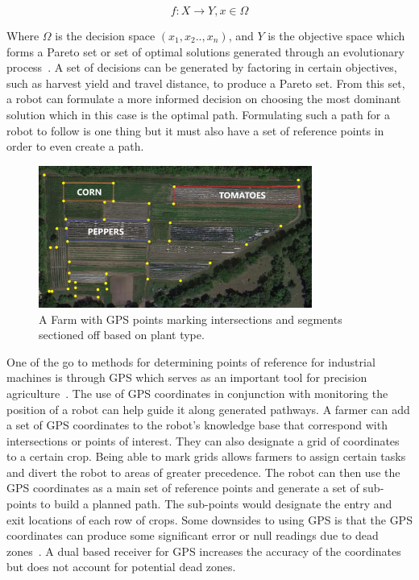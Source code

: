 \documentclass[12pt]{article}
\begin{document}
\begin{equation}
    f: X \rightarrow Y, x \in \Omega
\end{equation}

\noindent Where $\Omega$ is the decision space $(x_1, x_2..,x_n)$, and $Y$ is the objective space which forms a Pareto set or set of optimal solutions generated through an evolutionary process~\cite{zhou2021problem,zitzler2004tutorial}. A set of decisions can be generated by factoring in certain objectives, such as harvest yield and travel distance, to produce a Pareto set. From this set, a robot can formulate a more informed decision on choosing the most dominant solution which in this case is the optimal path. Formulating such a path for a robot to follow is one thing but it must also have a set of reference points in order to even create a path.

\begin{figure}[h]
\centering
\includegraphics[width=0.80\textwidth]{farmgps.png}
\caption{A Farm with GPS points marking intersections and segments sectioned off based on plant type.}
\end{figure}

One of the go to methods for determining points of reference for industrial machines is through GPS which serves as an important tool for precision agriculture~\cite{pandey2021evaluation}. The use of GPS coordinates in conjunction with monitoring the position of a robot can help guide it along generated pathways. A farmer can add a set of GPS coordinates to the robot's knowledge base that correspond with intersections or points of interest. They can also designate a grid of coordinates to a certain crop. Being able to mark grids allows farmers to assign certain tasks and divert the robot to areas of greater precedence. The robot can then use the GPS coordinates as a main set of reference points and generate a set of sub-points to build a planned path. The sub-points would designate the entry and exit locations of each row of crops. Some downsides to using GPS is that the GPS coordinates can produce some significant error or null readings due to dead zones~\cite{pandey2021evaluation}. A dual based receiver for GPS increases the accuracy of the coordinates but does not account for potential dead zones.
\end{document}
